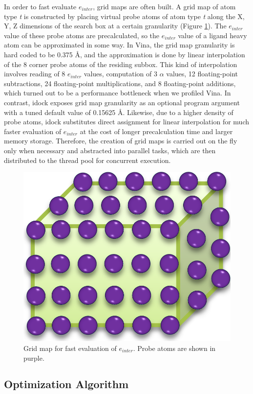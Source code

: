 \documentclass[10pt, conference, compsocconf]{IEEEtran}
\begin{document}
In order to fast evaluate $e_{inter}$, grid maps are often built. A grid map of atom type \textit{t} is constructed by placing virtual probe atoms of atom type \textit{t} along the X, Y, Z dimensions of the search box at a certain granularity (Figure \ref{fig:GridMap}). The $e_{inter}$ value of these probe atoms are precalculated, so the $e_{inter}$ value of a ligand heavy atom can be approximated in some way. In Vina, the grid map granularity is hard coded to be 0.375 \AA, and the approximation is done by linear interpolation of the 8 corner probe atoms of the residing subbox. This kind of interpolation involves reading of 8 $e_{inter}$ values, computation of 3 $\alpha$ values, 12 floating-point subtractions, 24 floating-point multiplications, and 8 floating-point additions, which turned out to be a performance bottleneck when we profiled Vina. In contrast, idock exposes grid map granularity as an optional program argument with a tuned default value of 0.15625 \AA. Likewise, due to a higher density of probe atoms, idock substitutes direct assignment for linear interpolation for much faster evaluation of $e_{inter}$ at the cost of longer precalculation time and larger memory storage. Therefore, the creation of grid maps is carried out on the fly only when necessary and abstracted into parallel tasks, which are then distributed to the thread pool for concurrent execution.

\begin{figure}
\centering
\includegraphics[width=0.5\linewidth]{Figures/NakedGridMap.png}
\caption{Grid map for fast evaluation of $e_{inter}$. Probe atoms are shown in purple.}
\label{fig:GridMap}
\end{figure}

\subsection{Optimization Algorithm}
\end{document}
